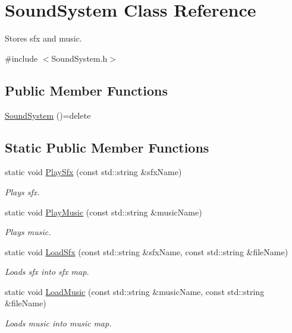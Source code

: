 \hypertarget{class_sound_system}{}\section{Sound\+System Class Reference}
\label{class_sound_system}


Stores sfx and music.  




{\ttfamily \#include $<$Sound\+System.\+h$>$}

\subsection*{Public Member Functions}
\begin{DoxyCompactItemize}
\item 
\mbox{\hyperlink{class_sound_system_abcef3503c51f6ccd300a821131afc366}{Sound\+System}} ()=delete
\end{DoxyCompactItemize}
\subsection*{Static Public Member Functions}
\begin{DoxyCompactItemize}
\item 
static void \mbox{\hyperlink{class_sound_system_a9682a8b69a9d40dcb85ba79e3c08da26}{Play\+Sfx}} (const std\+::string \&sfx\+Name)
\begin{DoxyCompactList}\small\item\em Plays sfx. \end{DoxyCompactList}\item 
static void \mbox{\hyperlink{class_sound_system_ac3c183dad9bb7a534d447f0189a2ce23}{Play\+Music}} (const std\+::string \&music\+Name)
\begin{DoxyCompactList}\small\item\em Plays music. \end{DoxyCompactList}\item 
static void \mbox{\hyperlink{class_sound_system_a43c3e75eb53c8d071b5d47a07b6d42fd}{Load\+Sfx}} (const std\+::string \&sfx\+Name, const std\+::string \&file\+Name)
\begin{DoxyCompactList}\small\item\em Loads sfx into sfx map. \end{DoxyCompactList}\item 
static void \mbox{\hyperlink{class_sound_system_a9e305a909ac0b2773dc9c888226b183d}{Load\+Music}} (const std\+::string \&music\+Name, const std\+::string \&file\+Name)
\begin{DoxyCompactList}\small\item\em Loads music into music map. \end{DoxyCompactList}\end{DoxyCompactItemize}


